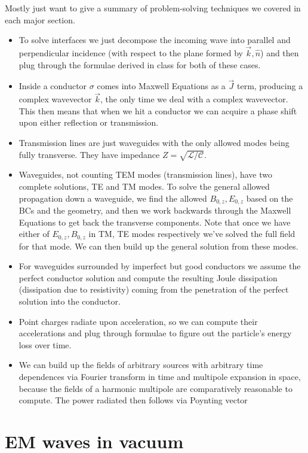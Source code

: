 \documentclass[10pt,twocolumn]{article}
\begin{document}
Mostly just want to give a summary of problem-solving techniques we covered in each major section.
\begin{itemize}
    \item To solve interfaces we just decompose the incoming wave into parallel and perpendicular incidence (with respect to the plane formed by $\vec{k}, \hat{n}$) and then plug through the formulae derived in class for both of these cases.
    \item Inside a conductor $\sigma$ comes into Maxwell Equations as a $\vec{J}$ term, producing a complex wavevector $\vec{k}$, the only time we deal with a complex wavevector. This then means that when we hit a conductor we can acquire a phase shift upon either reflection or transmission.
    \item Transmission lines are just waveguides with the only allowed modes being fully transverse. They have impedance $Z = \sqrt{\mathcal{L}/\mathcal{C}}$.
    \item Waveguides, not counting TEM modes (transmission lines), have two complete solutions, TE and TM modes. To solve the general allowed propagation down a waveguide, we find the allowed $B_{0,z}, E_{0,z}$ based on the BCs and the geometry, and then we work backwards through the Maxwell Equations to get back the transverse components. Note that once we have either of $E_{0,z}, B_{0,z}$ in TM, TE modes respectively we've solved the full field for that mode. We can then build up the general solution from these modes.
    \item For waveguides surrounded by imperfect but good conductors we assume the perfect conductor solution and compute the resulting Joule dissipation (dissipation due to resistivity) coming from the penetration of the perfect solution into the conductor. 
    \item Point charges radiate upon acceleration, so we can compute their accelerations and plug through formulae to figure out the particle's energy loss over time.
    \item We can build up the fields of arbitrary sources with arbitrary time dependences via Fourier transform in time and multipole expansion in space, because the fields of a harmonic multipole are comparatively reasonable to compute. The power radiated then follows via Poynting vector
\end{itemize}

\section{EM waves in vacuum}
\end{document}
